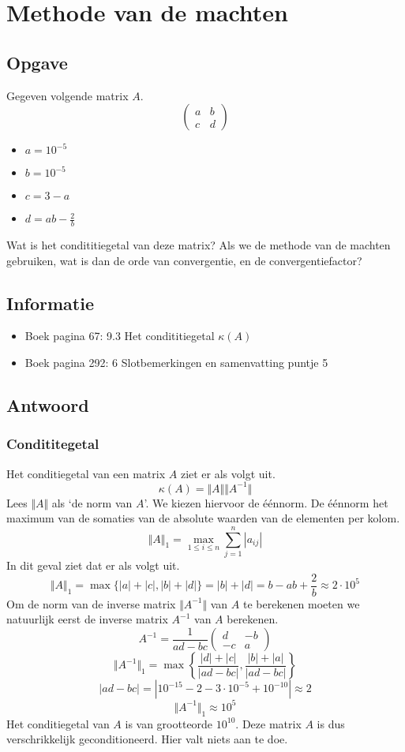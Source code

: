 \documentclass[examenvragen.tex]{subfiles}
\begin{document}
\section{Methode van de machten}

\subsection{Opgave}
Gegeven volgende matrix $A$.
\[
\begin{pmatrix}
a & b\\
c & d
\end{pmatrix}
\]
\begin{multicols}{4}
\begin{itemize}
\item $a=10^{-5}$
\item $b = 10^{-5}$
\item $c = 3-a$
\item $d = ab-\frac{2}{b}$
\end{itemize}
\end{multicols}
Wat is het condititiegetal van deze matrix? Als we de methode van de machten gebruiken, wat is dan de orde van convergentie, en de convergentiefactor? 

\subsection{Informatie}
\begin{itemize}
\item Boek pagina 67: 9.3 Het condititiegetal $\kappa(A)$
\item Boek pagina 292: 6 Slotbemerkingen en samenvatting puntje 5
\end{itemize}

\subsection{Antwoord}
\subsubsection{Condititegetal}
Het conditiegetal van een matrix $A$ ziet er als volgt uit.
\[
\kappa(A) = \Vert A\Vert\Vert A^{-1}\Vert
\]
Lees $\Vert A\Vert$ als `de norm van $A$'. We kiezen hiervoor de \'e\'ennorm. De \'e\'ennorm het maximum van de somaties van de absolute waarden van de elementen per kolom.
\[
\Vert A\Vert_{1} = \max_{1\le i\le n}\sum_{j=1}^{n}|a_{ij}|
\]
In dit geval ziet dat er als volgt uit.
\[
\Vert A\Vert_{1} = \max \{|a|+|c|, |b|+|d|\} = |b|+|d| = b-ab+\frac{2}{b} \approx 2\cdot 10^{5}
\]
Om de norm van de inverse matrix $\Vert A^{-1} \Vert$ van $A$ te berekenen moeten we natuurlijk eerst de inverse matrix $A^{-1}$ van $A$ berekenen.
\[
A^{-1} = 
\frac{1}{ad-bc}
\begin{pmatrix}
d & -b\\
-c &a
\end{pmatrix}
\]
\[
\Vert A^{-1}\Vert_{1} = \max \left\{\frac{|d|+|c|}{|ad-bc|},\frac{|b|+|a|}{|ad-bc|}\right\}
\]
\[
|ad-bc| = |10^{-15}-2- 3\cdot 10^{-5} + 10^{-10}| \approx 2
\]
\[
\Vert A^{-1}\Vert_{1} \approx 10^{5}
\]
Het conditiegetal van $A$ is van grootteorde $10^{10}$. Deze matrix $A$ is dus verschrikkelijk geconditioneerd. Hier valt niets aan te doe.
\end{document}
